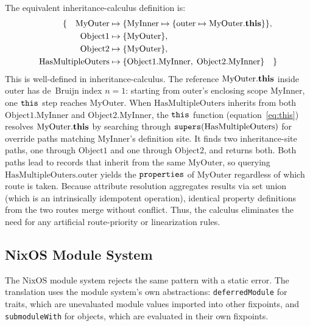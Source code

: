 The equivalent inheritance-calculus definition is:
\begin{align*}
  \{ \quad \mathrm{MyOuter} &\mapsto \{
      \mathrm{MyInner} \mapsto \{
    \mathrm{outer} \mapsto \mathrm{MyOuter}.\mathbf{this}\}\}, \\
    \mathrm{Object1} &\mapsto \{\mathrm{MyOuter}\}, \\
    \mathrm{Object2} &\mapsto \{\mathrm{MyOuter}\}, \\
    \mathrm{HasMultipleOuters} &\mapsto \{
      \mathrm{Object1}.\mathrm{MyInner},\;
    \mathrm{Object2}.\mathrm{MyInner}\}
  \quad \}
\end{align*}
This is well-defined in inheritance-calculus.
The reference
$\mathrm{MyOuter}.\mathbf{this}$ inside $\mathrm{outer}$
has de~Bruijn index $n = 1$:
starting from $\mathrm{outer}$'s enclosing scope
$\mathrm{MyInner}$, one $\mathtt{this}$ step reaches
$\mathrm{MyOuter}$.
When $\mathrm{HasMultipleOuters}$ inherits from both
$\mathrm{Object1}.\mathrm{MyInner}$ and
$\mathrm{Object2}.\mathrm{MyInner}$,
the $\mathtt{this}$ function (equation~\ref{eq:this}) resolves
$\mathrm{MyOuter}.\mathbf{this}$ by searching through
$\mathtt{supers}(\mathrm{HasMultipleOuters})$ for override paths matching
$\mathrm{MyInner}$'s definition site.
It finds two inheritance-site paths, one through
$\mathrm{Object1}$ and one through $\mathrm{Object2}$, and
returns both.
Both paths lead to records that inherit from the same
$\mathrm{MyOuter}$, so querying
$\mathrm{HasMultipleOuters}.\mathrm{outer}$ yields the
$\mathtt{properties}$ of $\mathrm{MyOuter}$ regardless of which
route is taken.
Because attribute resolution aggregates results via set union (which is an intrinsically idempotent operation), identical property definitions from the two routes merge without conflict. Thus, the calculus eliminates the need for any artificial route-priority or linearization rules.

\subsection*{NixOS Module System}

The NixOS module system rejects the same pattern with a static error.
The translation uses the module system's own abstractions:
\texttt{deferredModule} for traits, which are unevaluated module values imported
into other fixpoints, and \texttt{submoduleWith} for objects, which are evaluated
in their own fixpoints.

